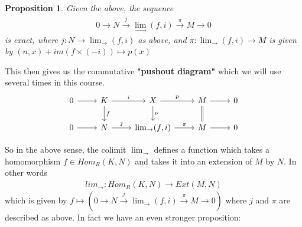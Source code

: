 \documentclass[12pt]{book}
\newtheorem{proposition}[theorem]{Proposition}
\theoremstyle{definition}
\begin{document}
\begin{proposition}
    Given the above, the sequence 
    \begin{align*}
        0 \rightarrow N \xrightarrow{j} \lim_{\rightarrow}(f,i) \xrightarrow{\pi} M \rightarrow 0
    \end{align*}
    is exact, where $j : N \to \lim_{\rightarrow}(f,i)$ as above, and $\pi: \lim_{\rightarrow}(f,i) \to M$ is given by $(n,x) + im(f \times (-i)) \mapsto p(x)$
\end{proposition}

This then gives us the commutative \textbf{"pushout diagram"} which we will use several times in this course. 
\[
    \begin{tikzcd}
        0 \arrow[r] & K \arrow[r, "i"] \arrow[d, "f"] 
        & X \arrow[r, "p"] \arrow[d, "\nu"] 
        & M \arrow[r] \arrow[d, equal]
        & 0\\
        0 \arrow[r] & N \arrow[r, "j"] 
        & \lim_{\rightarrow}(f,i) \arrow[r, "\pi"]  
        & M \arrow[r] 
        & 0
    \end{tikzcd}
\]

So in the above sense, the colimit $\lim_{\rightarrow}$ defines a function which takes a homomorphism $f \in Hom_R(K,N)$ and takes it into an extension of $M$ by $N$. In other words 
\begin{align*}
    lim_\rightarrow : Hom_R(K,N) \to Ext(M,N)
\end{align*}
which is given by $f \mapsto (0 \rightarrow N \xrightarrow{j} \lim_{\rightarrow}(f,i) \xrightarrow{\pi} M \rightarrow 0)$ where $j$ and $\pi$ are described as above. In fact we have an even stronger proposition: 
\end{document}
